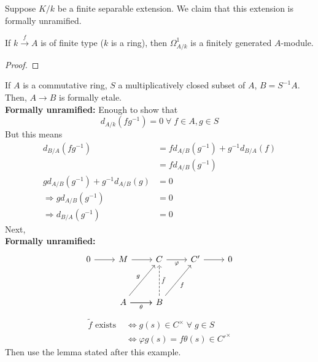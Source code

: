 \documentclass[oneside, 12pt]{scrbook}
\theoremstyle{theorem}
\begin{document}
\begin{exercise}
Suppose $K/k$ be a finite separable extension. We claim that this extension is formally unramified. 
\end{exercise}

\begin{lemma}
If $k \xrightarrow{f} A $ is of finite type ($k$ is a ring), then $\Omega_{A/k}^{1}$ is a finitely generated $A$-module.
\end{lemma}

\begin{proof}

\end{proof}

\begin{example}
If $A$ is a commutative ring, $S$ a multiplicatively closed subset of $A$, $B = S^{-1}A$. Then, $A \rightarrow B$ is formally etale. \\

\textbf{Formally unramified:} Enough to show that $$d_{A/k}(fg^{-1}) = 0 \; \forall \; f \in A , g\in S$$ But this means 
\begin{align*}
d_{B/A}(fg^{-1}) &= fd_{A/B} (g^{-1}) + g^{-1}d_{B/A}(f) \\
&= fd_{A/B}(g^{-1}) \\
gd_{A/B}(g^{-1}) + g^{-1}d_{A/B}(g) &= 0 \\
\Rightarrow gd_{A/B}(g^{-1}) &= 0 \\
\Rightarrow d_{B/A}(g^{-1}) &= 0
\end{align*}
Next, \\
\textbf{Formally unramified:}
\[\begin{tikzcd}
	0 & M & C & {C'} & 0 \\
	\\
	& A & B
	\arrow["g", from=3-2, to=1-3]
	\arrow["{\tilde{f}}"', dashed, from=3-3, to=1-3]
	\arrow["\theta"', from=3-2, to=3-3]
	\arrow[from=3-2, to=3-3]
	\arrow[from=1-1, to=1-2]
	\arrow[from=1-2, to=1-3]
	\arrow["\varphi"', from=1-3, to=1-4]
	\arrow[from=1-4, to=1-5]
	\arrow["f"', from=3-3, to=1-4]
\end{tikzcd}\]
\begin{align*}
\tilde{f} \text{ exists } &\Leftrightarrow g(s) \in C^{\times} \;\forall \; g \in S \\
&\Leftrightarrow \varphi g(s) = f\theta(s) \in C'^{\times}
\end{align*}
Then use the lemma stated after this example.
\end{example}
\end{document}
